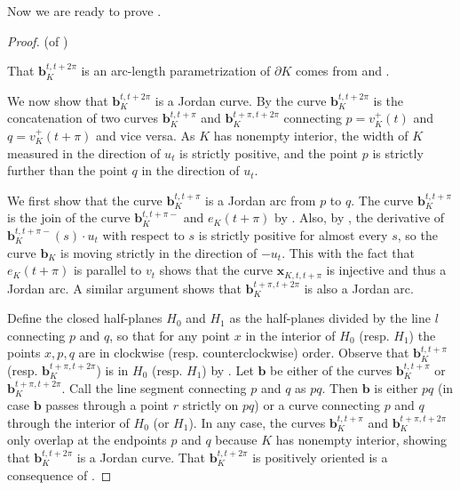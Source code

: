 Now we are ready to prove .

\begin{proof}
(of )

That \(\mathbf{b}_K^{t, t + 2\pi}\) is an arc-length parametrization of \(\partial K\) comes from  and .

We now show that \(\mathbf{b}_K^{t, t + 2\pi}\) is a Jordan curve. By  the curve \(\mathbf{b}_K^{t, t + 2\pi}\) is the concatenation of two curves \(\mathbf{b}_K^{t, t + \pi}\) and \(\mathbf{b}_K^{t + \pi, t + 2\pi}\) connecting \(p = v_{K}^+(t)\) and \(q = v_K^+(t + \pi)\) and vice versa. As \(K\) has nonempty interior, the width of \(K\) measured in the direction of \(u_t\) is strictly positive, and the point \(p\) is strictly further than the point \(q\) in the direction of \(u_t\).

We first show that the curve \(\mathbf{b}_K^{t, t + \pi}\) is a Jordan arc from \(p\) to \(q\). The curve \(\mathbf{b}_K^{t, t + \pi}\) is the join of the curve \(\mathbf{b}_K^{t, t + \pi-}\) and \(e_{K}(t + \pi)\) by . Also, by , the derivative of \(\mathbf{b}_K^{t, t + \pi-}(s) \cdot u_t\) with respect to \(s\) is strictly positive for almost every \(s\), so the curve \(\mathbf{b}_K\) is moving strictly in the direction of \(-u_t\). This with the fact that \(e_K(t + \pi)\) is parallel to \(v_t\) shows that the curve \(\mathbf{x}_{K, t, t + \pi}\) is injective and thus a Jordan arc. A similar argument shows that \(\mathbf{b}_K^{t + \pi, t + 2\pi}\) is also a Jordan arc.

Define the closed half-planes \(H_0\) and \(H_1\) as the half-planes divided by the line \(l\) connecting \(p\) and \(q\), so that for any point \(x\) in the interior of \(H_0\) (resp. \(H_1\)) the points \(x, p, q\) are in clockwise (resp. counterclockwise) order. Observe that \(\mathbf{b}_K^{t, t + \pi}\) (resp. \(\mathbf{b}_K^{t + \pi, t + 2\pi}\)) is in \(H_0\) (resp. \(H_1\)) by . Let \(\mathbf{b}\) be either of the curves \(\mathbf{b}_K^{t, t + \pi}\) or \(\mathbf{b}_K^{t + \pi, t + 2\pi}\). Call the line segment connecting \(p\) and \(q\) as \(pq\). Then \(\mathbf{b}\) is either \(pq\) (in case \(\mathbf{b}\) passes through a point \(r\) strictly on \(pq\)) or a curve connecting \(p\) and \(q\) through the interior of \(H_0\) (or \(H_1\)). In any case, the curves \(\mathbf{b}_K^{t, t + \pi}\) and \(\mathbf{b}_K^{t + \pi, t + 2\pi}\) only overlap at the endpoints \(p\) and \(q\) because \(K\) has nonempty interior, showing that \(\mathbf{b}_K^{t, t + 2\pi}\) is a Jordan curve. That \(\mathbf{b}_K^{t, t + 2\pi}\) is positively oriented is a consequence of .
\end{proof}

